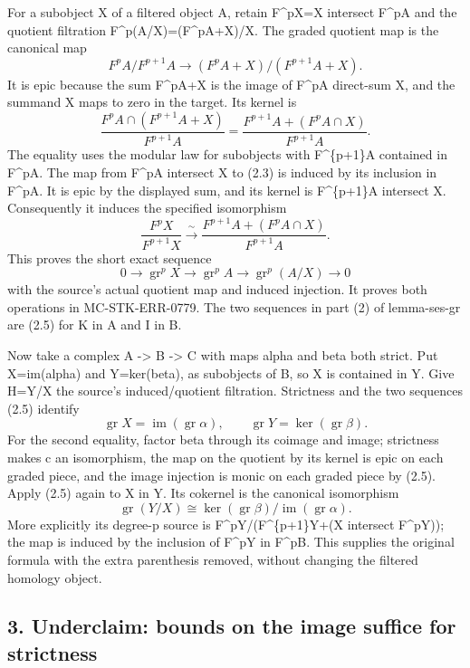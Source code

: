 For a subobject X of a filtered object A, retain F\^{}pX=X intersect F\^{}pA and the quotient filtration F\^{}p(A/X)=(F\^{}pA+X)/X. The graded quotient map is the canonical map \[
F^pA/F^{p+1}A
\longrightarrow
(F^pA+X)/(F^{p+1}A+X).                                    \tag{2.2}
\] It is epic because the sum F\^{}pA+X is the image of F\^{}pA direct-sum X, and the summand X maps to zero in the target. Its kernel is \[
\frac{F^pA\cap(F^{p+1}A+X)}{F^{p+1}A}
=\frac{F^{p+1}A+(F^pA\cap X)}{F^{p+1}A}.                  \tag{2.3}
\] The equality uses the modular law for subobjects with F\^{}\{p+1\}A contained in F\^{}pA. The map from F\^{}pA intersect X to (2.3) is induced by its inclusion in F\^{}pA. It is epic by the displayed sum, and its kernel is F\^{}\{p+1\}A intersect X. Consequently it induces the specified isomorphism \[
\frac{F^pX}{F^{p+1}X}
\xrightarrow{\ \sim\ }
\frac{F^{p+1}A+(F^pA\cap X)}{F^{p+1}A}.                    \tag{2.4}
\] This proves the short exact sequence \[
0\longrightarrow\operatorname{gr}^pX
\longrightarrow\operatorname{gr}^pA
\longrightarrow\operatorname{gr}^p(A/X)\longrightarrow0
                                                               \tag{2.5}
\] with the source's actual quotient map and induced injection. It proves both operations in MC-STK-ERR-0779. The two sequences in part (2) of lemma-ses-gr are (2.5) for K in A and I in B.

Now take a complex A -\textgreater{} B -\textgreater{} C with maps alpha and beta both strict. Put X=im(alpha) and Y=ker(beta), as subobjects of B, so X is contained in Y. Give H=Y/X the source's induced/quotient filtration. Strictness and the two sequences (2.5) identify \[
\operatorname{gr}X=\operatorname{im}(\operatorname{gr}\alpha),
\qquad
\operatorname{gr}Y=\ker(\operatorname{gr}\beta).
\] For the second equality, factor beta through its coimage and image; strictness makes c an isomorphism, the map on the quotient by its kernel is epic on each graded piece, and the image injection is monic on each graded piece by (2.5). Apply (2.5) again to X in Y. Its cokernel is the canonical isomorphism \[
\operatorname{gr}(Y/X)
\cong
\ker(\operatorname{gr}\beta)/
\operatorname{im}(\operatorname{gr}\alpha).                \tag{2.6}
\] More explicitly its degree-p source is F\^{}pY/(F\^{}\{p+1\}Y+(X intersect F\^{}pY)); the map is induced by the inclusion of F\^{}pY in F\^{}pB. This supplies the original formula with the extra parenthesis removed, without changing the filtered homology object.

\subsection{3. Underclaim: bounds on the image suffice for strictness}\label{note-05-underclaim-bounds-on-the-image-suffice-for-strictness}

